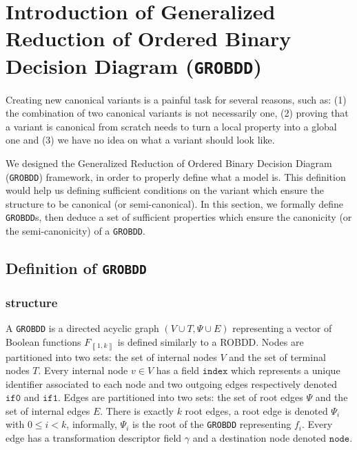 \documentclass[a4paper,10pt]{article}
\newcommand{\GroBdd}{\texttt{GROBDD}}
\newcommand{\fieldIndex}{\texttt{index}}
\newcommand{\fieldNode}{\texttt{node}}
\newcommand{\fieldThen}{\mathtt{if1}}
\newcommand{\fieldElse}{\mathtt{if0}}
\newcommand{\bras}[1]{{\left\llbracket{#1}\right\rrbracket}}
\begin{document}
\section{Introduction of Generalized Reduction of Ordered Binary Decision Diagram (\GroBdd{})}

Creating new canonical variants is a painful task for several reasons, such as: (1) the combination of two canonical variants is not necessarily one, (2) proving that a variant is canonical from scratch needs to turn a local property into a global one and (3) we have no idea on what a variant should look like.

We designed the Generalized Reduction of Ordered Binary Decision Diagram (\GroBdd{}) framework, in order to properly define what a model is.
This definition would help us defining sufficient conditions on the variant which ensure the structure to be canonical (or semi-canonical).
In this section, we formally define \GroBdd{}s, then deduce a set of sufficient properties which ensure the canonicity (or the semi-canonicity) of a \GroBdd{}.



\subsection{Definition of \GroBdd{}}

\subsubsection{structure}

A \GroBdd{} is a directed acyclic graph $(V\cup T, \Psi \cup E)$ representing a vector of Boolean functions $F_\bras{1, k}$ is defined similarly to a ROBDD.
Nodes are partitioned into two sets: the set of internal nodes $V$ and the set of terminal nodes $T$.
Every internal node $v\in V$ has a field $\fieldIndex{}$ which represents a unique identifier associated to each node and two outgoing edges respectively denoted $\fieldElse{}$ and $\fieldThen{}$.
Edges are partitioned into two sets: the set of root edges $\Psi$ and the set of internal edges $E$.
There is exactly $k$ root edges, a root edge is denoted $\Psi_i$ with $0\leq i < k$, informally, $\Psi_i$ is the root of the \GroBdd{} representing $f_i$.
Every edge has a transformation descriptor field $\gamma$ and a destination node denoted $\fieldNode{}$.
\end{document}
